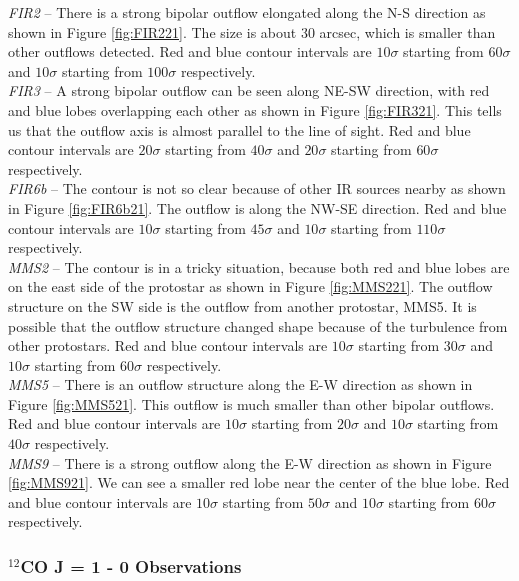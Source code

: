 \noindent\textit{FIR2} -- There is a strong bipolar outflow elongated along the N-S direction as shown in Figure \ref{fig:FIR221}. The size is about 30 arcsec, which is smaller than other outflows detected. Red and blue contour intervals are $10\sigma$ starting from $60\sigma$ and $10\sigma$ starting from $100\sigma$ respectively.\\
\textit{FIR3} -- A strong bipolar outflow can be seen along NE-SW direction, with red and blue lobes overlapping each other as shown in Figure \ref{fig:FIR321}. This tells us that the outflow axis is almost parallel to the line of sight. Red and blue contour intervals are $20\sigma$ starting from $40\sigma$ and $20\sigma$ starting from $60\sigma$ respectively. \\
\textit{FIR6b} -- The contour is not so clear because of other IR sources nearby as shown in Figure \ref{fig:FIR6b21}. The outflow is along the NW-SE direction. Red and blue contour intervals are $10\sigma$ starting from $45\sigma$ and $10\sigma$ starting from $110\sigma$ respectively.\\
\textit{MMS2} -- The contour is in a tricky situation, because both red and blue lobes are on the east side of the protostar as shown in Figure \ref{fig:MMS221}. The outflow structure on the SW side is the outflow from another protostar, MMS5. It is possible that the outflow structure changed shape because of the turbulence from other protostars. Red and blue contour intervals are $10\sigma$ starting from $30\sigma$ and $10\sigma$ starting from $60\sigma$ respectively.\\
\textit{MMS5} -- There is an outflow structure along the E-W direction as shown in Figure \ref{fig:MMS521}. This outflow is much smaller than other bipolar outflows. Red and blue contour intervals are $10\sigma$ starting from $20\sigma$ and $10\sigma$ starting from $40\sigma$ respectively.\\
\textit{MMS9} -- There is a strong outflow along the E-W direction as shown in Figure \ref{fig:MMS921}. We can see a smaller red lobe near the center of the blue lobe. Red and blue contour intervals are $10\sigma$ starting from $50\sigma$ and $10\sigma$ starting from $60\sigma$ respectively.\\

\subsubsection{$^{12}$CO J = 1 - 0 Observations}

